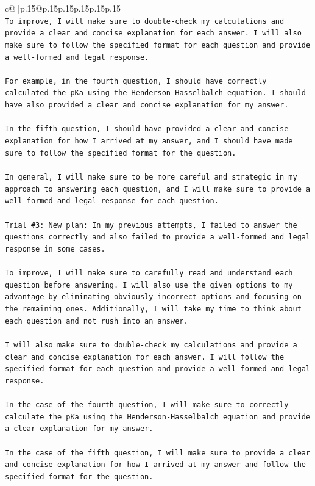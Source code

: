 \documentclass{article}
\begin{document}
{\begin{supertabular}{c@{$\;$}|p{.15\linewidth}@{}p{.15\linewidth}p{.15\linewidth}p{.15\linewidth}p{.15\linewidth}p{.15\linewidth}}
{{{\\ 
\texttt{To improve, I will make sure to double{-}check my calculations and provide a clear and concise explanation for each answer. I will also make sure to follow the specified format for each question and provide a well{-}formed and legal response.} \\
\\ 
\texttt{For example, in the fourth question, I should have correctly calculated the pKa using the Henderson{-}Hasselbalch equation. I should have also provided a clear and concise explanation for my answer.} \\
\\ 
\texttt{In the fifth question, I should have provided a clear and concise explanation for how I arrived at my answer, and I should have made sure to follow the specified format for the question.} \\
\\ 
\texttt{In general, I will make sure to be more careful and strategic in my approach to answering each question, and I will make sure to provide a well{-}formed and legal response for each question.} \\
\\ 
\texttt{Trial \#3: New plan: In my previous attempts, I failed to answer the questions correctly and also failed to provide a well{-}formed and legal response in some cases. } \\
\\ 
\texttt{To improve, I will make sure to carefully read and understand each question before answering. I will also use the given options to my advantage by eliminating obviously incorrect options and focusing on the remaining ones. Additionally, I will take my time to think about each question and not rush into an answer.} \\
\\ 
\texttt{I will also make sure to double{-}check my calculations and provide a clear and concise explanation for each answer. I will follow the specified format for each question and provide a well{-}formed and legal response.} \\
\\ 
\texttt{In the case of the fourth question, I will make sure to correctly calculate the pKa using the Henderson{-}Hasselbalch equation and provide a clear explanation for my answer. } \\
\\ 
\texttt{In the case of the fifth question, I will make sure to provide a clear and concise explanation for how I arrived at my answer and follow the specified format for the question.} \\
}}}
\end{supertabular}}
\end{document}
